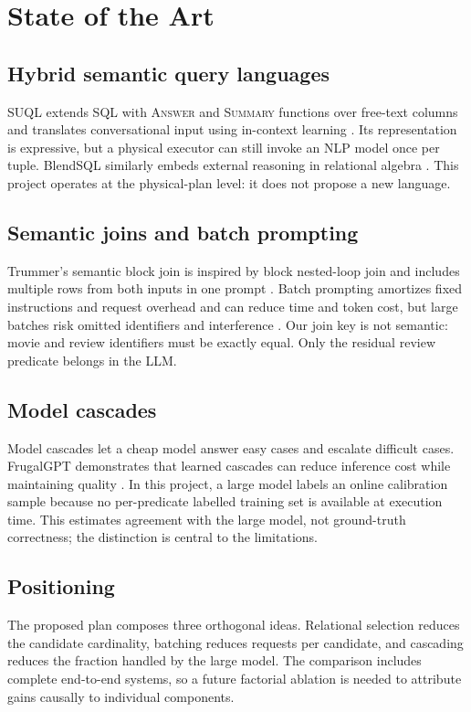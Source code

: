 \chapter{State of the Art}
\section{Hybrid semantic query languages}
SUQL extends SQL with \textsc{Answer} and \textsc{Summary} functions over free-text
columns and translates conversational input using in-context learning
\cite{liu2024suql}. Its representation is expressive, but a physical executor can
still invoke an NLP model once per tuple. BlendSQL similarly embeds external
reasoning in relational algebra \cite{glenn2024blendsql}. This project operates at
the physical-plan level: it does not propose a new language.

\section{Semantic joins and batch prompting}
Trummer's semantic block join is inspired by block nested-loop join and includes
multiple rows from both inputs in one prompt \cite{trummer2025semanticjoins}. Batch
prompting amortizes fixed instructions and request overhead and can reduce time and
token cost, but large batches risk omitted identifiers and interference
\cite{cheng2023batch}. Our join key is not semantic: movie and review identifiers
must be exactly equal. Only the residual review predicate belongs in the LLM.

\section{Model cascades}
Model cascades let a cheap model answer easy cases and escalate difficult cases.
FrugalGPT demonstrates that learned cascades can reduce inference cost while
maintaining quality \cite{chen2023frugalgpt}. In this project, a large model labels
an online calibration sample because no per-predicate labelled training set is
available at execution time. This estimates agreement with the large model, not
ground-truth correctness; the distinction is central to the limitations.

\section{Positioning}
The proposed plan composes three orthogonal ideas. Relational selection reduces the
candidate cardinality, batching reduces requests per candidate, and cascading
reduces the fraction handled by the large model. The comparison includes complete
end-to-end systems, so a future factorial ablation is needed to attribute gains
causally to individual components.
